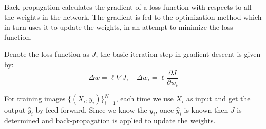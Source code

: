 \documentclass[landscape,a0paper,fontscale=0.285]{baposter} %
\begin{document}
\begin{poster}
{Back-propagation calculates the gradient of a loss function with respects to all the weights in the network.
The gradient is fed to the optimization method which in turn uses it to update the weights, in an attempt to minimize the loss function.
\vspace{5pt}

Denote the loss function as $J$, the basic iteration step in gradient descent is given by:
\[ \Delta w = \ell \nabla J, \quad \Delta w_i = \ell \frac{\partial J}{\partial w_i} \]

For training images $ \{(X_i,y_i)\}_{i=1}^N$, each time we use $X_i$ as input and get the output $\hat{y}_i$ by feed-forward.
Since we know the $y_i$, once $\hat{y}_i$ is known then $J$ is determined and back-propagation is applied to update the weights.
}










\end{poster}
\end{document}
